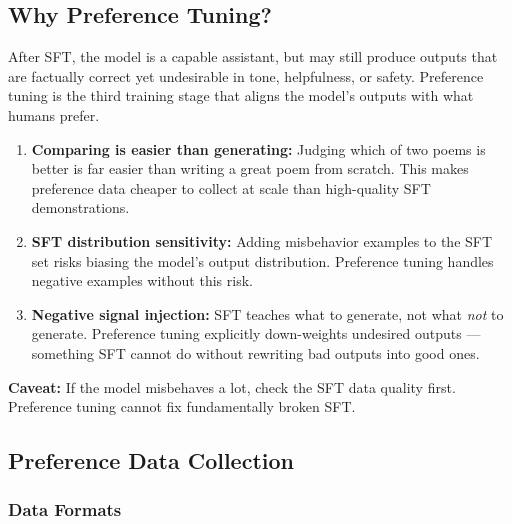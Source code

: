 \documentclass[11pt, a4paper]{article}
\begin{document}
\subsection{Why Preference Tuning?}

After SFT, the model is a capable assistant, but may still produce outputs that are factually correct yet undesirable in tone, helpfulness, or safety. Preference tuning is the third training stage that aligns the model's outputs with what humans prefer.

\begin{defbox}
\begin{enumerate}[leftmargin=1.5em]
  \item \textbf{Comparing is easier than generating:} Judging which of two poems is better is far easier than writing a great poem from scratch. This makes preference data cheaper to collect at scale than high-quality SFT demonstrations.
  \item \textbf{SFT distribution sensitivity:} Adding misbehavior examples to the SFT set risks biasing the model's output distribution. Preference tuning handles negative examples without this risk.
  \item \textbf{Negative signal injection:} SFT teaches what to generate, not what \emph{not} to generate. Preference tuning explicitly down-weights undesired outputs --- something SFT cannot do without rewriting bad outputs into good ones.
\end{enumerate}
\textbf{Caveat:} If the model misbehaves a lot, check the SFT data quality first. Preference tuning cannot fix fundamentally broken SFT.
\end{defbox}

\subsection{Preference Data Collection}

\subsubsection{Data Formats}
\end{document}
